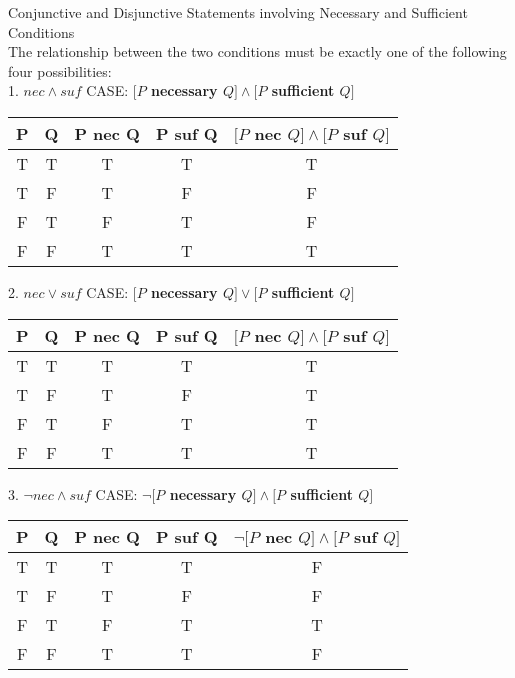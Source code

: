 \newpage
\begin{definition}
Conjunctive and Disjunctive Statements involving Necessary and Sufficient Conditions \\

The relationship between the two conditions must be exactly one of the following four possibilities: \\
1. $nec \wedge suf$ CASE: {\bf $[P$ necessary $Q] \wedge [P$ sufficient $Q]$} \\
\begin{center}
\begin{tabular}{|c|c|c|c|c|}
\hline 
P & Q & P nec Q & P suf Q & $[P$ nec $Q] \wedge [P$ suf $Q]$  \\ 
\hline 
T & T & T & T & T\\ 
\hline 
T & F & T & F & F\\ 
\hline 
F & T & F & T & F\\ 
\hline 
F & F & T & T & T\\ 
\hline 
\end{tabular} 
\end{center}

2. $nec \vee suf$ CASE: {\bf $[P$ necessary $Q] \vee [P$ sufficient $Q]$} \\
\begin{center}
\begin{tabular}{|c|c|c|c|c|}
\hline 
P & Q & P nec Q & P suf Q & $[P$ nec $Q] \wedge [P$ suf $Q]$  \\ 
\hline 
T & T & T & T & T\\ 
\hline 
T & F & T & F & T\\ 
\hline 
F & T & F & T & T\\ 
\hline 
F & F & T & T & T\\ 
\hline 
\end{tabular} 
\end{center}

3. $\neg nec \wedge suf$ CASE: {\bf $\neg[P$ necessary $Q] \wedge [P$ sufficient $Q]$} \\
\begin{center}
\begin{tabular}{|c|c|c|c|c|}
\hline 
P & Q & P nec Q & P suf Q & $\neg[P$ nec $Q] \wedge [P$ suf $Q]$  \\ 
\hline 
T & T & T & T & F\\ 
\hline 
T & F & T & F & F\\ 
\hline 
F & T & F & T & T\\ 
\hline 
F & F & T & T & F\\ 
\hline 
\end{tabular} 
\end{center}



\end{definition}
